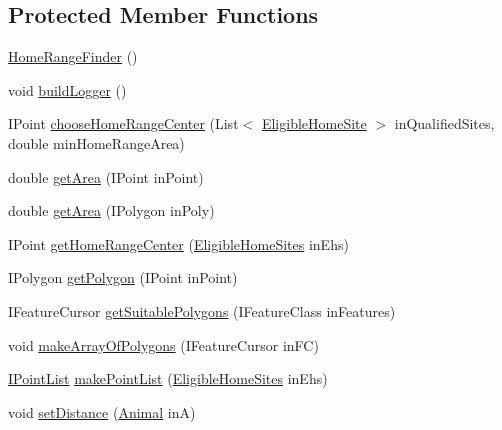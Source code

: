 \subsection*{Protected Member Functions}
\begin{DoxyCompactItemize}
\item 
\hyperlink{class_s_e_a_r_c_h_1_1_home_range_finder_af8bbe5c80277c37b7ab5d52e3e3f9eee}{Home\-Range\-Finder} ()
\item 
void \hyperlink{class_s_e_a_r_c_h_1_1_home_range_finder_abad00bb4ab60d23d836ead95d47c9ab7}{build\-Logger} ()
\item 
I\-Point \hyperlink{class_s_e_a_r_c_h_1_1_home_range_finder_a3afdb5c57d8b28d3a73f664fa4a6aeff}{choose\-Home\-Range\-Center} (List$<$ \hyperlink{class_s_e_a_r_c_h_1_1_eligible_home_site}{Eligible\-Home\-Site} $>$ in\-Qualified\-Sites, double min\-Home\-Range\-Area)
\item 
double \hyperlink{class_s_e_a_r_c_h_1_1_home_range_finder_aa3f14f619622faed6d6a0a98478bdbbf}{get\-Area} (I\-Point in\-Point)
\item 
double \hyperlink{class_s_e_a_r_c_h_1_1_home_range_finder_a8421eb01daa296e355c8cb63d3dbed20}{get\-Area} (I\-Polygon in\-Poly)
\item 
I\-Point \hyperlink{class_s_e_a_r_c_h_1_1_home_range_finder_aaa80430fcd57c47337bef5edb34cedf7}{get\-Home\-Range\-Center} (\hyperlink{class_s_e_a_r_c_h_1_1_eligible_home_sites}{Eligible\-Home\-Sites} in\-Ehs)
\item 
I\-Polygon \hyperlink{class_s_e_a_r_c_h_1_1_home_range_finder_a802ad742ff286588d0986401b13a5260}{get\-Polygon} (I\-Point in\-Point)
\item 
I\-Feature\-Cursor \hyperlink{class_s_e_a_r_c_h_1_1_home_range_finder_ad2d3ef0b0f55957ebad25d0f2a395ed6}{get\-Suitable\-Polygons} (I\-Feature\-Class in\-Features)
\item 
void \hyperlink{class_s_e_a_r_c_h_1_1_home_range_finder_ae107836c253caf611d08be84d350ba38}{make\-Array\-Of\-Polygons} (I\-Feature\-Cursor in\-F\-C)
\item 
\hyperlink{class_s_e_a_r_c_h_1_1_i_point_list}{I\-Point\-List} \hyperlink{class_s_e_a_r_c_h_1_1_home_range_finder_a09c218455700f3edcfe230af423753d5}{make\-Point\-List} (\hyperlink{class_s_e_a_r_c_h_1_1_eligible_home_sites}{Eligible\-Home\-Sites} in\-Ehs)
\item 
void \hyperlink{class_s_e_a_r_c_h_1_1_home_range_finder_ac4489d478a6b1c80b706de156179b7a5}{set\-Distance} (\hyperlink{class_s_e_a_r_c_h_1_1_animal}{Animal} in\-A)
\item 

\end{DoxyCompactItemize}

